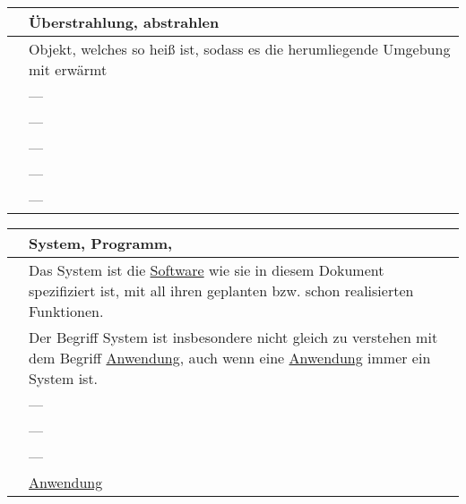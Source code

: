 \begin{center}
	\hypertarget{tab:strahlung}{}
	\begin{tabular}{| p{4cm} | p{11cm} |}
		\hline
		\term & Überstrahlung, abstrahlen \\ \hline
		
		\intent & Objekt, welches so heiß ist, sodass es die herumliegende Umgebung mit erwärmt \\ \hline
		
		\bound & --- \\ \hline
		
		\validity & --- \\ \hline
		
		\identifier & --- \\ \hline
		
		\blur & --- \\ \hline
		
		\crossref & --- \\
		\hline
	\end{tabular}
\end{center}

\begin{center}
	\hypertarget{tab:system}{}
	\begin{tabular}{| p{4cm} | p{11cm} |}
		\hline
		\term & System, Programm, \profire \\ \hline
		
		\intent & Das System ist die \hyperlink{tab:anwendung}{Software} wie sie in diesem Dokument spezifiziert ist, mit all ihren geplanten bzw. schon realisierten Funktionen. \\ \hline
		
		\bound & Der Begriff System ist insbesondere nicht gleich zu verstehen mit dem Begriff \hyperlink{tab:anwendung}{Anwendung}, auch wenn eine \hyperlink{tab:anwendung}{Anwendung} immer ein System ist. \\ \hline
		
		\validity & --- \\ \hline
		
		\identifier & --- \\ \hline
		
		\blur & --- \\ \hline
		
		\crossref & \hyperlink{tab:anwendung}{Anwendung} \\
		\hline
	\end{tabular}
\end{center}

